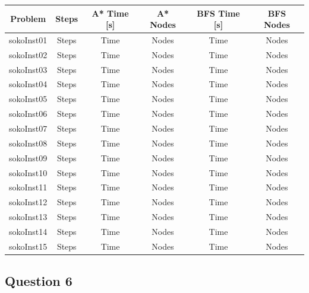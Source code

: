 \documentclass[a4paper,10pt]{article}
\begin{document}
			\begin{tabular}{|c||c||c|c||c|c|}
				\hline 
				\textbf{Problem} & \textbf{Steps} & \textbf{A* Time [s]} & \textbf{A* Nodes} & \textbf{BFS Time [s]} & \textbf{BFS Nodes} \\ 
				\hline 
				sokoInst01 & Steps & Time & Nodes & Time & Nodes \\ 
				\hline
				sokoInst02 & Steps & Time & Nodes & Time & Nodes \\ 
				\hline
				sokoInst03 & Steps & Time & Nodes & Time & Nodes \\ 
				\hline
				sokoInst04 & Steps & Time & Nodes & Time & Nodes \\ 
				\hline
				sokoInst05 & Steps & Time & Nodes & Time & Nodes \\ 
				\hline
				sokoInst06 & Steps & Time & Nodes & Time & Nodes \\ 
				\hline
				sokoInst07 & Steps & Time & Nodes & Time & Nodes \\ 
				\hline
				sokoInst08 & Steps & Time & Nodes & Time & Nodes \\ 
				\hline
				sokoInst09 & Steps & Time & Nodes & Time & Nodes \\ 
				\hline
				sokoInst10 & Steps & Time & Nodes & Time & Nodes \\ 
				\hline
				sokoInst11 & Steps & Time & Nodes & Time & Nodes \\ 
				\hline
				sokoInst12 & Steps & Time & Nodes & Time & Nodes \\ 
				\hline
				sokoInst13 & Steps & Time & Nodes & Time & Nodes \\ 
				\hline
				sokoInst14 & Steps & Time & Nodes & Time & Nodes \\ 
				\hline
				sokoInst15 & Steps & Time & Nodes & Time & Nodes \\ 
				\hline
			\end{tabular}
			
		
		\subsection{Question 6}
		
\end{document}

